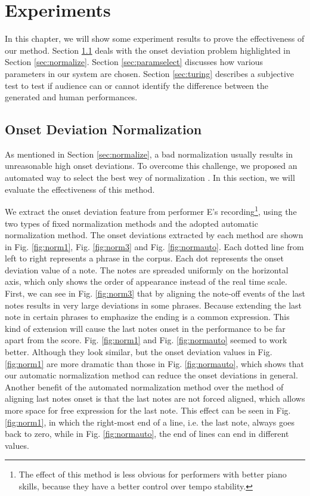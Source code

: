 \chapter{Experiments}
\label{chap:exp}
In this chapter, we will show some experiment results to prove the effectiveness of our method. Section \ref{sec:onsetnormexp} deals with the onset deviation problem highlighted in Section \ref{sec:normalize}. Section \ref{sec:paramselect} discusses how various parameters in our system are chosen. Section \ref{sec:turing} describes a subjective test to test if audience can or cannot identify the difference between the generated and human performances.


\section{Onset Deviation Normalization}
\label{sec:onsetnormexp}
As mentioned in Section \ref{sec:normalize}, a bad normalization usually results in unreasonable high onset deviations. To overcome this challenge, we proposed an automated way to select the best wey of normalization . In this section, we will evaluate the effectiveness of this method. 

We extract the onset deviation feature from performer E's recording\footnote{The effect of this method is less obvious for performers with better piano skills, because they have a better control over tempo stability.}, using the two types of fixed normalization methods and the adopted automatic normalization method. The onset deviations extracted by each method are shown in Fig. \ref{fig:norm1}, Fig. \ref{fig:norm3} and Fig. \ref{fig:normauto}. Each dotted line from left to right represents a phrase in the corpus. Each dot represents the onset deviation value of a note. The notes are spreaded uniformly  on the horizontal axis, which only shows the order of appearance instead of the real time scale. First, we can see in Fig. \ref{fig:norm3} that by aligning the note-off events of the last notes results in very large deviations in some phrases. Because extending the last note in certain phrases to emphasize the ending is a common expression. This kind of extension will cause the last notes onset in the performance to be far apart from the score. Fig. \ref{fig:norm1} and Fig. \ref{fig:normauto} seemed to work better. Although they look similar, but the onset deviation values in Fig. \ref{fig:norm1} are more dramatic than those in Fig. \ref{fig:normauto}, which shows that our automatic normalization method can reduce the onset deviations in general. Another benefit of the automated normalization method over the method of aligning last notes onset is that the last notes are not forced aligned, which allows more space for free expression for the last note. This effect can be seen in Fig. \ref{fig:norm1}, in which the right-most end of a line, i.e. the last note, always goes back to zero, while in Fig. \ref{fig:normauto}, the end of lines can end in different values.



